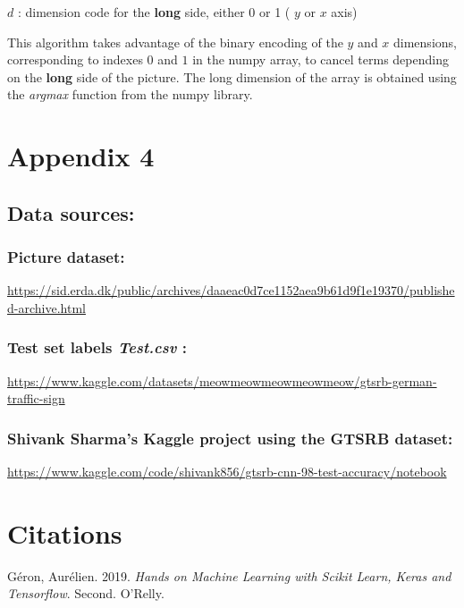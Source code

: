 \documentclass[
  11pt,
]{article}
\newlength{\cslhangindent}
\newlength{\cslentryspacingunit} %
\newenvironment{CSLReferences}[2] %
 {%
  \setlength{\parindent}{0pt}
  \ifodd #1
  \let\oldpar\par
  \def\par{\hangindent=\cslhangindent\oldpar}
  \fi
  \setlength{\parskip}{#2\cslentryspacingunit}
 }%
 {}
\begin{document}
\(d\) : dimension code for the \textbf{long} side, either 0 or 1 ( \(y\)
or \(x\) axis)

This algorithm takes advantage of the binary encoding of the \(y\) and
\(x\) dimensions, corresponding to indexes \(0\) and \(1\) in the numpy
array, to cancel terms depending on the \textbf{long} side of the
picture. The long dimension of the array is obtained using the
\emph{argmax} function from the numpy library.

\pagebreak

\hypertarget{appendix-4}{%
\section{Appendix 4}\label{appendix-4}}

\hypertarget{data-sources}{%
\subsection{Data sources:}\label{data-sources}}

\hypertarget{picture-dataset}{%
\subsubsection{Picture dataset:}\label{picture-dataset}}

\url{https://sid.erda.dk/public/archives/daaeac0d7ce1152aea9b61d9f1e19370/published-archive.html}

\hypertarget{test-set-labels-test.csv}{%
\subsubsection{\texorpdfstring{Test set labels \emph{Test.csv}
:}{Test set labels Test.csv :}}\label{test-set-labels-test.csv}}

\url{https://www.kaggle.com/datasets/meowmeowmeowmeowmeow/gtsrb-german-traffic-sign}

\hypertarget{shivank-sharmas-kaggle-project-using-the-gtsrb-dataset}{%
\subsubsection{Shivank Sharma's Kaggle project using the GTSRB
dataset:}\label{shivank-sharmas-kaggle-project-using-the-gtsrb-dataset}}

\url{https://www.kaggle.com/code/shivank856/gtsrb-cnn-98-test-accuracy/notebook}

\pagebreak

\hypertarget{citations}{%
\section*{Citations}\label{citations}}

\hypertarget{refs}{}
\begin{CSLReferences}{1}{0}
\leavevmode{}%
Géron, Aurélien. 2019. \emph{Hands on Machine Learning with Scikit
Learn, Keras and Tensorflow}. Second. O'Relly.

\end{CSLReferences}
\end{document}
